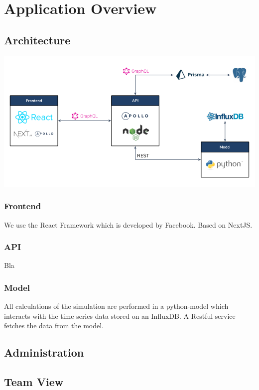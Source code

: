 \section{Application Overview}

\subsection{Architecture}

\begin{center}
  \includegraphics[scale=0.45]{img/architecture.png}
\end{center}

\subsubsection{Frontend}
We use the React Framework which is developed by Facebook. Based on NextJS.

\subsubsection{API}
Bla


\subsubsection{Model}
All calculations of the simulation are performed in a python-model which interacts with the time series data stored on an InfluxDB. A Restful service fetches the data from the model.

\subsection{Administration}

\subsection{Team View}

